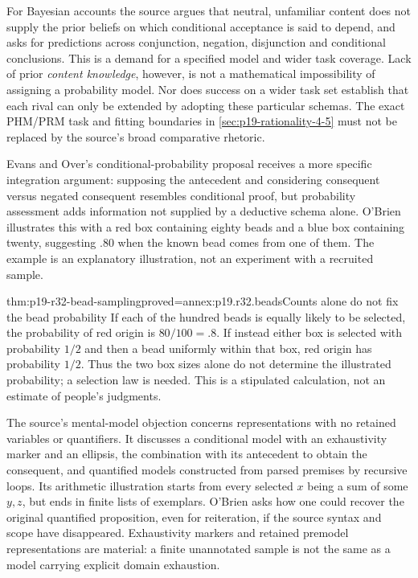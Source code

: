 For Bayesian accounts the source argues that neutral, unfamiliar content
does not supply the prior beliefs on which conditional acceptance is said
to depend, and asks for predictions across conjunction, negation,
disjunction and conditional conclusions. This is a demand for a specified
model and wider task coverage. Lack of prior \emph{content knowledge},
however, is not a mathematical impossibility of assigning a probability
model. Nor does success on a wider task set establish that each rival
can only be extended by adopting these particular schemas. The exact
PHM/PRM task and fitting boundaries in
\cref{sec:p19-rationality-4-5} must not be replaced by the source's broad
comparative rhetoric.

Evans and Over's conditional-probability proposal receives a more specific
integration argument: supposing the antecedent and considering consequent
versus negated consequent resembles conditional proof, but probability
assessment adds information not supplied by a deductive schema alone.
O'Brien illustrates this with a red box containing eighty beads and a
blue box containing twenty, suggesting .80 when the known bead comes
from one of them. The example is an explanatory illustration, not an
experiment with a recruited sample.

\begin{hblemma}{thm:p19-r32-bead-sampling}{proved=annex:p19.r32.beads}{Counts alone do not fix the bead probability}
If each of the hundred beads is equally likely to be selected,
the probability of red origin is \(80/100=.8\). If instead either
box is selected with probability \(1/2\) and then a bead uniformly
within that box, red origin has probability \(1/2\).
Thus the two box sizes alone do not determine the illustrated probability;
a selection law is needed. This is a stipulated calculation, not an
estimate of people's judgments.
\end{hblemma}

The source's mental-model objection concerns representations with no
retained variables or quantifiers. It discusses a conditional model with
an exhaustivity marker and an ellipsis, the combination with its
antecedent to obtain the consequent, and quantified models constructed
from parsed premises by recursive loops. Its arithmetic illustration
starts from every selected \(x\) being a sum of some \(y,z\), but
ends in finite lists of exemplars. O'Brien asks how one could recover
the original quantified proposition, even for reiteration, if the
source syntax and scope have disappeared. Exhaustivity markers and
retained premodel representations are material: a finite unannotated
sample is not the same as a model carrying explicit domain exhaustion.

